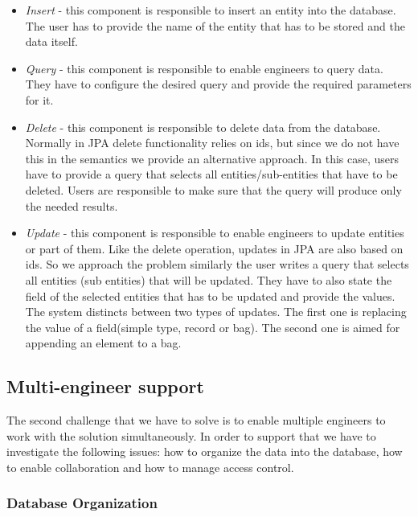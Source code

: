 \begin{itemize}
	\item \textit{Insert} - this component is responsible to insert an entity into the database. The user has to provide the name of the entity that has to be stored and the data itself.
	
	\item \textit{Query} - this component is responsible to enable engineers to query data. They have to configure the desired query and provide the required parameters for it.
	
	\item \textit{Delete} - this component is responsible to delete data from the database. Normally in JPA delete functionality relies on ids, but since we do not have this in the semantics we provide an alternative approach. In this case, users have to provide a query that selects all entities/sub-entities that have to be deleted. Users are responsible to make sure that the query will produce only the needed results.
	
	\item \textit{Update} - this component is responsible to enable engineers to update entities or part of them. Like the delete operation, updates in JPA are also based on ids. So we approach the problem similarly the user writes a query that selects all entities (sub entities) that will be updated. They have to also state the field of the selected entities that has to be updated and provide the values. The system distincts between two types of updates. The first one is replacing the value of a field(simple type, record or bag). The second one is aimed for appending an element to a bag.
\end{itemize}

\subsection{Multi-engineer support}

The second challenge that we have to solve is to enable multiple engineers to work with the solution simultaneously. In order to support that we have to investigate the following issues: how to organize the data into the database, how to enable collaboration and how to manage access control.

\subsubsection{Database Organization}

